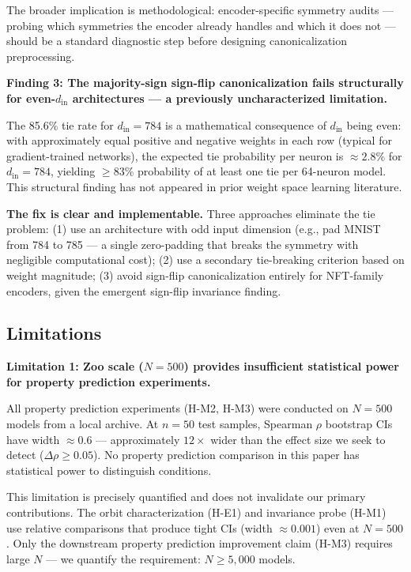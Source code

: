 The broader implication is methodological: encoder-specific symmetry audits --- probing which symmetries the encoder already handles and which it does not --- should be a standard diagnostic step before designing canonicalization preprocessing.

\textbf{Finding 3: The majority-sign sign-flip canonicalization fails structurally for even-$d_{\mathrm{in}}$ architectures --- a previously uncharacterized limitation.}

The 85.6\% tie rate for $d_{\mathrm{in}}=784$ is a mathematical consequence of $d_{\mathrm{in}}$ being even: with approximately equal positive and negative weights in each row (typical for gradient-trained networks), the expected tie probability per neuron is $\approx 2.8\%$ for $d_{\mathrm{in}}=784$, yielding $\geq 83\%$ probability of at least one tie per 64-neuron model. This structural finding has not appeared in prior weight space learning literature.

\textbf{The fix is clear and implementable.} Three approaches eliminate the tie problem: (1) use an architecture with odd input dimension (e.g., pad MNIST from 784 to 785 --- a single zero-padding that breaks the symmetry with negligible computational cost); (2) use a secondary tie-breaking criterion based on weight magnitude; (3) avoid sign-flip canonicalization entirely for NFT-family encoders, given the emergent sign-flip invariance finding.

\subsection{Limitations}

\textbf{Limitation 1: Zoo scale ($N=500$) provides insufficient statistical power for property prediction experiments.}

All property prediction experiments (H-M2, H-M3) were conducted on $N=500$ models from a local archive. At $n=50$ test samples, Spearman $\rho$ bootstrap CIs have width $\approx 0.6$ --- approximately $12\times$ wider than the effect size we seek to detect ($\Delta\rho \geq 0.05$). No property prediction comparison in this paper has statistical power to distinguish conditions.

This limitation is precisely quantified and does not invalidate our primary contributions. The orbit characterization (H-E1) and invariance probe (H-M1) use relative comparisons that produce tight CIs (width $\approx 0.001$) even at $N=500$. Only the downstream property prediction improvement claim (H-M3) requires large $N$ --- we quantify the requirement: $N \geq 5{,}000$ models.

